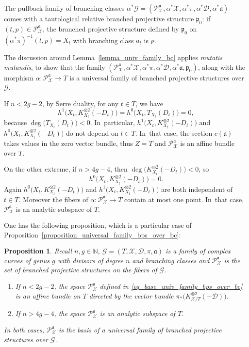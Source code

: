 \documentclass[JEP,XML,SOM,Unicode,NoEqCountersInSection,published]{cedram}
\newcommand{\N}{\mathbb N}
\theoremstyle{definition}
\theoremstyle{plain}
\newtheorem{proposition}[definition]{Proposition}
\begin{document}
The pullback family of branching classes $\alpha^*\mathcal G = \left(\mathcal P_{\mathcal X}^{\mathfrak a}, \alpha^*\mathcal X, \alpha^* \pi, \alpha^* \mathcal D, \alpha^* \mathfrak a\right)$ comes with a tautological relative branched projective structure $\mathfrak p_0$: if $(t, p) \in \mathcal P_{\mathcal X}^{\mathfrak a}$, the branched projective structure defined by $\mathfrak p_0$ on $\left(\alpha^*\pi\right)^{-1}(t, p) = X_t$ with branching class $a_t$ is $p$.

The discussion around Lemma~\ref{lemma_univ_family_bc} applies \emph{mutatis mutandis}, to show that the family $\left(\mathcal P_{\mathcal X}^{\mathfrak a}, \alpha^*\mathcal X, \alpha^* \pi, \alpha^* \mathcal D, \alpha^* \mathfrak a, \mathfrak p_0\right)$, along with the morphism $\alpha: \mathcal P_{\mathcal X}^{\mathfrak a} \to T$ is a universal family of branched projective structures over $\mathcal G$.

If $n < 2g-2$, by Serre duality, for any $t \in T$, we have
\[
h^1\bigl(X_t, K_{X_t}^{\otimes 2}(-D_t)\bigr) = h^0\bigl(X_t, T_{X_t}(D_t)\bigr) = 0,
\]
because $\deg\bigl(T_{X_t}(D_t)\bigr) < 0$. In~particular, $h^1\bigl(X_t, K_{X_t}^{\otimes 2}(-D_t)\bigr)$ and $h^0\bigl(X_t, K_{X_t}^{\otimes 2}(-D_t)\bigr)$ do not depend on $t \in T$. In~that case, the section $c(\mathfrak a)$ takes values in the zero vector bundle, thus $Z = T$ and $\mathcal P_{\mathcal X}^{\mathfrak a}$ is an affine bundle over $T$.

On the other extreme, if $n > 4g-4$, then $\deg\bigl(K_{X_t}^{\otimes 2}(-D_t)\bigr) < 0$, so
\[
h^0\bigl(X_t, K_{X_t}^{\otimes 2}(-D_t)\bigr) = 0.
\]
Again $h^0\bigl(X_t, K_{X_t}^{\otimes 2}(-D_t)\bigr)$ and $h^1\bigl(X_t, K_{X_t}^{\otimes 2}(-D_t)\bigr)$ are both independent of $t \in T$.
Moreover the fibers of $\alpha: \mathcal P_{\mathcal X}^{\mathfrak a} \to T$ contain at most one point. In~that case, $\mathcal P_{\mathcal X}^{\mathfrak a}$ is an analytic subspace of $T$.

One has the following proposition, which is a particular case of Proposition~\ref{proposition_universal_family_bps_over_bc}:

\begin{proposition}\label{proposition_univ_family_bps_low_high_deg}
Recall $n, g \in \N$, $\mathcal G = (T, \mathcal X, \mathcal D, \pi, \mathfrak a)$ is a family of complex curves of genus $g$ with divisors of degree $n$ and branching classes and $\mathcal P_{\mathcal X}^{\mathfrak a}$ is the set of branched projective structures on the fibers of $\mathcal G$.
\begin{enumerate}
\item
If $n < 2g-2$, the space $\mathcal P_{\mathcal X}^{\mathfrak a}$ defined in \eqref{eq_base_univ_family_bps_over_bc} is an affine bundle on $T$ directed by the vector bundle $\pi_*\bigl(K_{\mathcal X/T}^{\otimes 2}(-\mathcal D)\bigr)$.
\item
If $n > 4g-4$, the space $\mathcal P_{\mathcal X}^{\mathfrak a}$ is an analytic subspace of $T$.
\end{enumerate}
In both cases, $\mathcal P_{\mathcal X}^{\mathfrak a}$ is the basis of a universal family of branched projective structures over $\mathcal G$.
\end{proposition}
\end{document}
